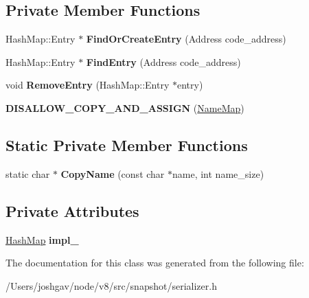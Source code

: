 \subsection*{Private Member Functions}
\begin{DoxyCompactItemize}
\item 
Hash\+Map\+::\+Entry $\ast$ {\bfseries Find\+Or\+Create\+Entry} (Address code\+\_\+address)\hypertarget{classv8_1_1internal_1_1_code_address_map_1_1_name_map_a8cc8f56260f6d7a9f2b3ce580c64b536}{}\label{classv8_1_1internal_1_1_code_address_map_1_1_name_map_a8cc8f56260f6d7a9f2b3ce580c64b536}

\item 
Hash\+Map\+::\+Entry $\ast$ {\bfseries Find\+Entry} (Address code\+\_\+address)\hypertarget{classv8_1_1internal_1_1_code_address_map_1_1_name_map_afecc31576a647c021d1f92b454d8c137}{}\label{classv8_1_1internal_1_1_code_address_map_1_1_name_map_afecc31576a647c021d1f92b454d8c137}

\item 
void {\bfseries Remove\+Entry} (Hash\+Map\+::\+Entry $\ast$entry)\hypertarget{classv8_1_1internal_1_1_code_address_map_1_1_name_map_ae98b876274b10c3b8d4aeb9b8b32da2a}{}\label{classv8_1_1internal_1_1_code_address_map_1_1_name_map_ae98b876274b10c3b8d4aeb9b8b32da2a}

\item 
{\bfseries D\+I\+S\+A\+L\+L\+O\+W\+\_\+\+C\+O\+P\+Y\+\_\+\+A\+N\+D\+\_\+\+A\+S\+S\+I\+GN} (\hyperlink{classv8_1_1internal_1_1_code_address_map_1_1_name_map}{Name\+Map})\hypertarget{classv8_1_1internal_1_1_code_address_map_1_1_name_map_a6b5840f4630bbe572bcd498a626a272e}{}\label{classv8_1_1internal_1_1_code_address_map_1_1_name_map_a6b5840f4630bbe572bcd498a626a272e}

\end{DoxyCompactItemize}
\subsection*{Static Private Member Functions}
\begin{DoxyCompactItemize}
\item 
static char $\ast$ {\bfseries Copy\+Name} (const char $\ast$name, int name\+\_\+size)\hypertarget{classv8_1_1internal_1_1_code_address_map_1_1_name_map_a67981b415b724e4bda2310f5922f5ebc}{}\label{classv8_1_1internal_1_1_code_address_map_1_1_name_map_a67981b415b724e4bda2310f5922f5ebc}

\end{DoxyCompactItemize}
\subsection*{Private Attributes}
\begin{DoxyCompactItemize}
\item 
\hyperlink{classv8_1_1internal_1_1_template_hash_map_impl}{Hash\+Map} {\bfseries impl\+\_\+}\hypertarget{classv8_1_1internal_1_1_code_address_map_1_1_name_map_a6fab951b8582b084ac3dbcb9c668d5af}{}\label{classv8_1_1internal_1_1_code_address_map_1_1_name_map_a6fab951b8582b084ac3dbcb9c668d5af}

\end{DoxyCompactItemize}


The documentation for this class was generated from the following file\+:\begin{DoxyCompactItemize}
\item 
/\+Users/joshgav/node/v8/src/snapshot/serializer.\+h\end{DoxyCompactItemize}
